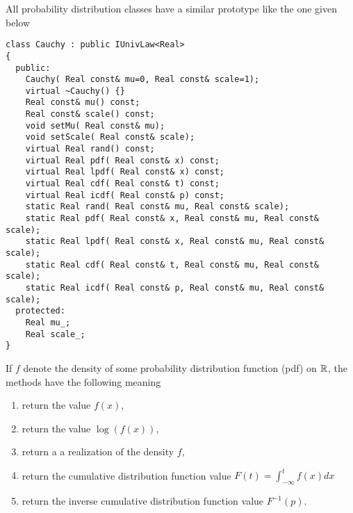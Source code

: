\documentclass[a4paper,10pt]{article}
\begin{document}
All probability distribution classes have a similar prototype like the one given below
\begin{lstlisting}[style=customcpp,caption=Prototype of probability distribution class (example taken from Cauchy class)]
class Cauchy : public IUnivLaw<Real>
{
  public:
    Cauchy( Real const& mu=0, Real const& scale=1);
    virtual ~Cauchy() {}
    Real const& mu() const;
    Real const& scale() const;
    void setMu( Real const& mu);
    void setScale( Real const& scale);
    virtual Real rand() const;
    virtual Real pdf( Real const& x) const;
    virtual Real lpdf( Real const& x) const;
    virtual Real cdf( Real const& t) const;
    virtual Real icdf( Real const& p) const;
    static Real rand( Real const& mu, Real const& scale);
    static Real pdf( Real const& x, Real const& mu, Real const& scale);
    static Real lpdf( Real const& x, Real const& mu, Real const& scale);
    static Real cdf( Real const& t, Real const& mu, Real const& scale);
    static Real icdf( Real const& p, Real const& mu, Real const& scale);
  protected:
    Real mu_;
    Real scale_;
}
\end{lstlisting}
If $f$ denote the density of some probability distribution function (pdf) on $\mathbb{R}$,
the methods have the following meaning
\begin{enumerate}
\item {} return the value $f(x)$,
\item {} return the value $\log(f(x))$,
\item {} return a a realization of the density $f$,
\item {} return the cumulative distribution function value $F(t)=\int_{-\infty}^t f(x) dx$
\item {} return the inverse cumulative distribution function value $F^{-1}(p)$.
\end{enumerate}
\end{document}
